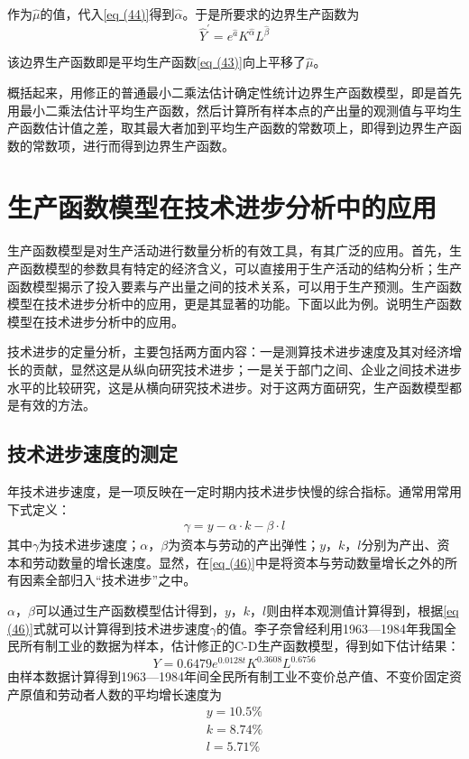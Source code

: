 	作为$ \hat{\mu} $的值，代入\eqref{eq (44)}得到$ \hat{\alpha} $。于是所要求的边界生产函数为
	$$ \hat{Y}^{\prime}=e^{\hat{a}} K^{\hat{\alpha}} L^{\hat{\beta}} $$
	
	该边界生产函数即是平均生产函数\eqref{eq (43)}向上平移了$ \hat{\mu} $。
		
	概括起来，用修正的普通最小二乘法估计确定性统计边界生产函数模型，即是首先用最小二乘法估计平均生产函数，然后计算所有样本点的产出量的观测值与平均生产函数估计值之差，取其最大者加到平均生产函数的常数项上，即得到边界生产函数的常数项，进行而得到边界生产函数。

\section{生产函数模型在技术进步分析中的应用} 
		
	生产函数模型是对生产活动进行数量分析的有效工具，有其广泛的应用。首先，生产函数模型的参数具有特定的经济含义，可以直接用于生产活动的结构分析；生产函数模型揭示了投入要素与产出量之间的技术关系，可以用于生产预测。生产函数模型在技术进步分析中的应用，更是其显著的功能。下面以此为例。说明生产函数模型在技术进步分析中的应用。
		
	技术进步的定量分析，主要包括两方面内容：一是测算技术进步速度及其对经济增长的贡献，显然这是从纵向研究技术进步；一是关于部门之间、企业之间技术进步水平的比较研究，这是从横向研究技术进步。对于这两方面研究，生产函数模型都是有效的方法。
		
{\subsection{技术进步速度的测定} }
		
	年技术进步速度，是一项反映在一定时期内技术进步快慢的综合指标。通常用常用下式定义：
	\begin{align}
		\gamma=y-\alpha \cdot k-\beta \cdot l \label{eq (46)}
	\end{align}
	其中$ \gamma $为技术进步速度；$ \alpha $，$ \beta $为资本与劳动的产出弹性；$ y $，$ k $，$ l $分别为产出、资本和劳动数量的增长速度。显然，在\eqref{eq (46)}中是将资本与劳动数量增长之外的所有因素全部归入“技术进步”之中。
		
	$ \alpha $，$ \beta $可以通过生产函数模型估计得到，$ y $，$ k $，$ l $则由样本观测值计算得到，根据\eqref{eq (46)}式就可以计算得到技术进步速度$ \gamma $的值。李子奈曾经利用1963—1984年我国全民所有制工业的数据为样本，估计修正的C-D生产函数模型，得到如下估计结果：
	$$ Y=0.6479 e^{0.0128 t} K^{0.3608} L^{0.6756} $$
	由样本数据计算得到1963—1984年间全民所有制工业不变价总产值、不变价固定资产原值和劳动者人数的平均增长速度为
	\begin{align*}
		y=10.5\%  \\
		k=8.74\%  \\
		l=5.71\% 
	\end{align*}

